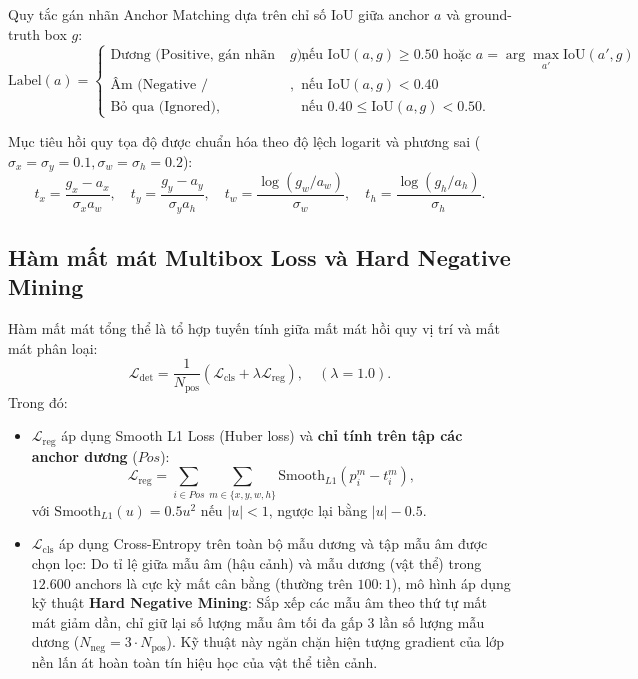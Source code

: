 \documentclass[fontsize=13pt,a4paper,oneside,DIV=calc,chapterprefix=true]{scrbook}
\begin{document}
Quy tắc gán nhãn Anchor Matching dựa trên chỉ số $\mathrm{IoU}$ giữa anchor $a$ và ground-truth box $g$:
\begin{equation}
\mathrm{Label}(a) = \begin{cases}
\text{Dương (Positive, gán nhãn theo } g), & \text{nếu } \mathrm{IoU}(a, g) \ge 0.50 \text{ hoặc } a = \arg\max_{a'} \mathrm{IoU}(a', g) \\
\text{Âm (Negative / Background)}, & \text{nếu } \mathrm{IoU}(a, g) < 0.40 \\
\text{Bỏ qua (Ignored)}, & \text{nếu } 0.40 \le \mathrm{IoU}(a, g) < 0.50.
\end{cases}
\end{equation}

Mục tiêu hồi quy tọa độ được chuẩn hóa theo độ lệch logarit và phương sai ($\sigma_x = \sigma_y = 0.1, \sigma_w = \sigma_h = 0.2$):
\begin{equation}
t_x = \frac{g_x - a_x}{\sigma_x a_w}, \quad t_y = \frac{g_y - a_y}{\sigma_y a_h}, \quad t_w = \frac{\log(g_w / a_w)}{\sigma_w}, \quad t_h = \frac{\log(g_h / a_h)}{\sigma_h}.
\end{equation}

\subsection{Hàm mất mát Multibox Loss và Hard Negative Mining}
Hàm mất mát tổng thể là tổ hợp tuyến tính giữa mất mát hồi quy vị trí và mất mát phân loại:
\begin{equation}
\mathcal{L}_{\mathrm{det}} = \frac{1}{N_{\mathrm{pos}}} \left( \mathcal{L}_{\mathrm{cls}} + \lambda \mathcal{L}_{\mathrm{reg}} \right), \quad (\lambda = 1.0).
\label{eq:multibox}
\end{equation}
Trong đó:
\begin{itemize}[leftmargin=1.2cm]
    \item $\mathcal{L}_{\mathrm{reg}}$ áp dụng Smooth L1 Loss (Huber loss) và \textbf{chỉ tính trên tập các anchor dương} ($Pos$):
    \begin{equation}
    \mathcal{L}_{\mathrm{reg}} = \sum_{i \in Pos} \sum_{m \in \{x,y,w,h\}} \mathrm{Smooth}_{L1}(p_i^m - t_i^m),
    \end{equation}
    với $\mathrm{Smooth}_{L1}(u) = 0.5 u^2$ nếu $|u| < 1$, ngược lại bằng $|u| - 0.5$.
    \item $\mathcal{L}_{\mathrm{cls}}$ áp dụng Cross-Entropy trên toàn bộ mẫu dương và tập mẫu âm được chọn lọc:
    Do tỉ lệ giữa mẫu âm (hậu cảnh) và mẫu dương (vật thể) trong $12.600$ anchors là cực kỳ mất cân bằng (thường trên $100:1$), mô hình áp dụng kỹ thuật \textbf{Hard Negative Mining}: Sắp xếp các mẫu âm theo thứ tự mất mát giảm dần, chỉ giữ lại số lượng mẫu âm tối đa gấp $3$ lần số lượng mẫu dương ($N_{\mathrm{neg}} = 3 \cdot N_{\mathrm{pos}}$). Kỹ thuật này ngăn chặn hiện tượng gradient của lớp nền lấn át hoàn toàn tín hiệu học của vật thể tiền cảnh.
\end{itemize}
\end{document}
